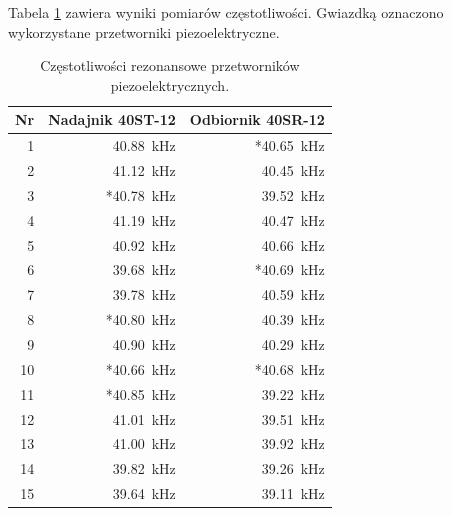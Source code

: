 Tabela \ref{table:czestotliwosci} zawiera wyniki pomiarów częstotliwości. Gwiazdką oznaczono wykorzystane przetworniki piezoelektryczne.

\begin{table}[t]
  \centering
  \begin{tabular}{|r|r|r|}
    \hline 
    Nr & Nadajnik 40ST-12 & Odbiornik 40SR-12\\
    \hline
    1  &   \SI{40,88}{kHz} & *\SI{40,65}{kHz} \\
    2  &   \SI{41,12}{kHz} &  \SI{40,45}{kHz} \\
    3  &  *\SI{40,78}{kHz} &  \SI{39,52}{kHz} \\
    4  &   \SI{41,19}{kHz} &  \SI{40,47}{kHz} \\
    5  &   \SI{40,92}{kHz} &  \SI{40,66}{kHz} \\
    6  &   \SI{39,68}{kHz} & *\SI{40,69}{kHz} \\
    7  &   \SI{39,78}{kHz} &  \SI{40,59}{kHz} \\
    8  &  *\SI{40,80}{kHz} &  \SI{40,39}{kHz} \\
    9  &   \SI{40,90}{kHz} &  \SI{40,29}{kHz} \\
    10 &  *\SI{40,66}{kHz} & *\SI{40,68}{kHz} \\
    11 &  *\SI{40,85}{kHz} &  \SI{39,22}{kHz} \\
    12 &   \SI{41,01}{kHz} &  \SI{39,51}{kHz} \\
    13 &   \SI{41,00}{kHz} &  \SI{39,92}{kHz} \\
    14 &   \SI{39,82}{kHz} &  \SI{39,26}{kHz} \\
    15 &   \SI{39,64}{kHz} &  \SI{39,11}{kHz} \\
    \hline
  \end{tabular}
  \caption{Częstotliwości rezonansowe przetworników piezoelektrycznych.}
  \label{table:czestotliwosci}
\end{table}


